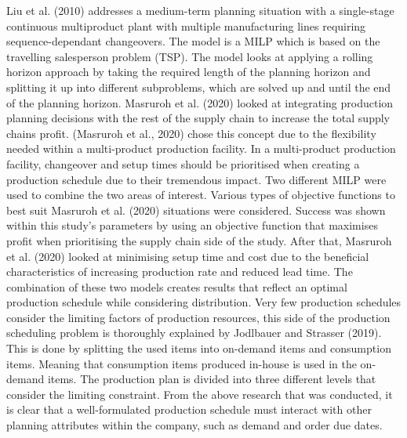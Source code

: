 \documentclass[a4paper,11pt,fleqn]{report}
\begin{document}
                    Liu et al. (2010) addresses a medium-term planning situation with a single-stage continuous multiproduct plant with multiple manufacturing lines requiring sequence-dependant changeovers. The model is a MILP which is based on the travelling salesperson problem (TSP). The model looks at applying a rolling horizon approach by taking the required length of the planning horizon and splitting it up into different subproblems, which are solved up and until the end of the planning horizon.
                    Masruroh et al. (2020) looked at integrating production planning decisions with the rest of the supply chain to increase the total supply chains profit. (Masruroh et al., 2020) chose this concept due to the flexibility needed within a multi-product production facility. In a multi-product production facility, changeover and setup times should be prioritised when creating a production schedule due to their tremendous impact. Two different MILP were used to combine the two areas of interest. Various types of objective functions to best suit Masruroh et al. (2020) situations were considered. Success was shown within this study's parameters by using an objective function that maximises profit when prioritising the supply chain side of the study. After that, Masruroh et al. (2020) looked at minimising setup time and cost due to the beneficial characteristics of increasing production rate and reduced lead time. The combination of these two models creates results that reflect an optimal production schedule while considering distribution.
                    Very few production schedules consider the limiting factors of production resources, this side of the production scheduling problem is thoroughly explained by Jodlbauer and Strasser (2019). This is done by splitting the used items into on-demand items and consumption items. Meaning that consumption items produced in-house is used in the on-demand items. The production plan is divided into three different levels that consider the limiting constraint.
                    From the above research that was conducted, it is clear that a well-formulated production schedule must interact with other planning attributes within the company, such as demand and order due dates.
\end{document}
